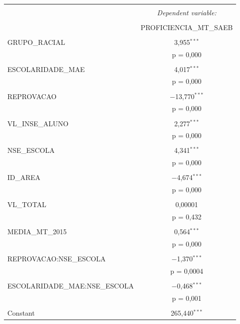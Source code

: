 \begin{table}[!htbp] \centering 
  \caption{} 
  \label{} 
\begin{tabular}{@{\extracolsep{5pt}}lc} 
\\[-1.8ex]\hline 
\hline \\[-1.8ex] 
 & \multicolumn{1}{c}{\textit{Dependent variable:}} \\ 
\cline{2-2} 
\\[-1.8ex] & PROFICIENCIA\_MT\_SAEB \\ 
\hline \\[-1.8ex] 
 GRUPO\_RACIAL & 3,955$^{***}$ \\ 
  & p = 0,000 \\ 
  & \\ 
 ESCOLARIDADE\_MAE & 4,017$^{***}$ \\ 
  & p = 0,000 \\ 
  & \\ 
 REPROVACAO & $-$13,770$^{***}$ \\ 
  & p = 0,000 \\ 
  & \\ 
 VL\_INSE\_ALUNO & 2,277$^{***}$ \\ 
  & p = 0,000 \\ 
  & \\ 
 NSE\_ESCOLA & 4,341$^{***}$ \\ 
  & p = 0,000 \\ 
  & \\ 
 ID\_AREA & $-$4,674$^{***}$ \\ 
  & p = 0,000 \\ 
  & \\ 
 VL\_TOTAL & 0,00001 \\ 
  & p = 0,432 \\ 
  & \\ 
 MEDIA\_MT\_2015 & 0,564$^{***}$ \\ 
  & p = 0,000 \\ 
  & \\ 
 REPROVACAO:NSE\_ESCOLA & $-$1,370$^{***}$ \\ 
  & p = 0,0004 \\ 
  & \\ 
 ESCOLARIDADE\_MAE:NSE\_ESCOLA & $-$0,468$^{***}$ \\ 
  & p = 0,001 \\ 
  & \\ 
 Constant & 265,440$^{***}$ \\ 

\end{tabular}
\end{table}
